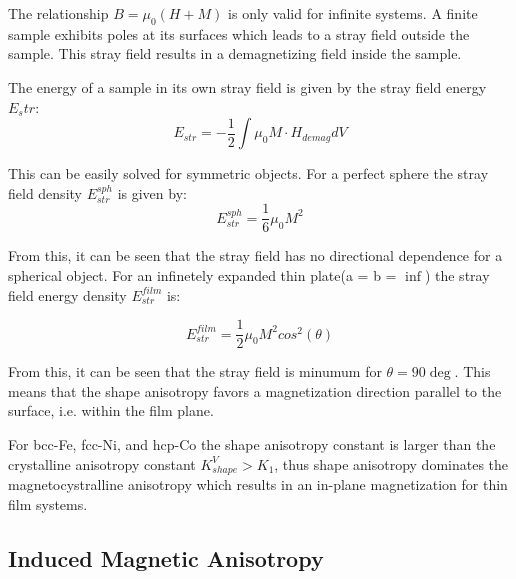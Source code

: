 \documentclass[12pt]{article} %
\begin{document}
The relationship $B = \mu_0\left (H + M\right )$ is only valid for infinite systems. A finite sample exhibits poles at its surfaces which leads to a stray field outside the sample. This stray field results in a demagnetizing field inside the sample.

The energy of a sample in its own stray field is given by the stray field energy $E_str$:
\begin{equation}
E_{str} = - \frac{1}{2} \int \mu_0 M \cdot H_{demag} dV
\end{equation}

This can be easily solved for symmetric objects. For a perfect sphere the stray field density $E_{str}^{sph}$ is given by:
\begin{equation}
E_{str}^{sph} = \frac{1}{6} \mu_0 M^2
\end{equation}

From this, it can be seen that the stray field has no directional dependence for a spherical object. For an infinetely expanded thin plate(a = b = $\inf$) the stray field energy density $E_{str}^{film}$ is:

\begin{equation}
E_{str}^{film} = \frac{1}{2} \mu_0 M^2 cos^2 \left ( \theta \right )
\end{equation}

From this, it can be seen that the stray field is minumum for $\theta = 90 \deg$. This means that the shape anisotropy favors a magnetization direction parallel to the surface, i.e. within the film plane.

For bcc-Fe, fcc-Ni, and hcp-Co the shape anisotropy constant is larger than the crystalline anisotropy constant $K_{shape}^V > K_1$, thus shape anisotropy dominates the magnetocystralline anisotropy which results in an in-plane magnetization for thin film systems.

\subsection{Induced Magnetic Anisotropy}
\end{document}
